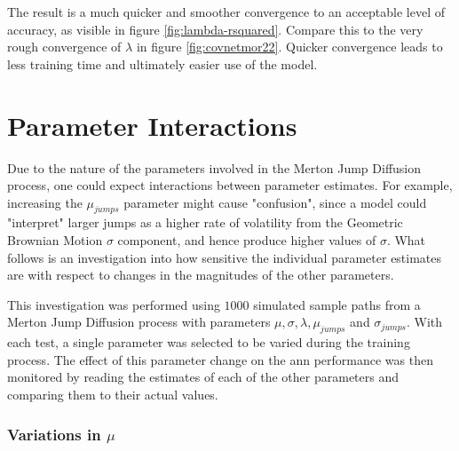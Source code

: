 \documentclass[11pt,oneside,openany,a4paper,english, report, goldenblock
]{usthesis}
\begin{document}
The result is a much quicker and smoother convergence to an acceptable level of accuracy, as visible in figure \ref{fig:lambda-rsquared}. Compare this to the very rough convergence of $\lambda$ in figure \ref{fig:covnetmor22}. Quicker convergence leads to less training time and ultimately easier use of the model.

\section{Parameter Interactions}
Due to the nature of the parameters involved in the Merton Jump Diffusion process, one could expect interactions between parameter estimates. For example, increasing the $\mu_{jumps}$ parameter might cause "confusion", since a model could "interpret" larger jumps as a higher rate of volatility from the Geometric Brownian Motion $\sigma$ component, and hence produce higher values of $\sigma$. What follows is an investigation into how sensitive the individual parameter estimates are with respect to changes in the magnitudes of the other parameters. 

This investigation was performed using $1000$ simulated sample paths from a Merton Jump Diffusion process with parameters $\mu, \sigma, \lambda, \mu_{jumps}$ and $\sigma_{jumps}$. With each test, a single parameter was selected to be varied during the training process. The effect of this parameter change on the \acrshort{ann} performance was then monitored by reading the estimates of each of the other parameters and comparing them to their actual values.

\subsubsection{Variations in $\mu$}
\end{document}
